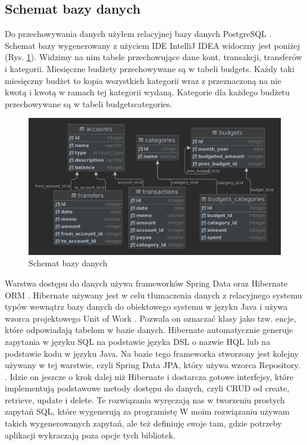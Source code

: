 \documentclass[shortabstract,inz]{iithesis}
\begin{document}
\subsection{Schemat bazy danych}
Do przechowywania danych użyłem relacyjnej bazy danych PostgreSQL \citep{pgsql}. Schemat bazy wygenerowany z użyciem IDE IntelliJ IDEA \citep{idea} widoczny jest poniżej (Rys. \ref{fig:db-diagram}). Widzimy na nim tabele przechowujące dane kont, transakcji, transferów i kategorii. Miesięczne budżety przechowywane są w tabeli budgets. Każdy taki miesięczny budżet to kopia wszystkich kategorii wraz z przeznaczoną na nie kwotą i kwotą w ramach tej kategorii wydaną. Kategorie dla każdego budżetu przechowywane są w tabeli budgets\textunderscore categories.
\begin{figure}
	\centering
	\includegraphics[scale=0.23]{db_diagram.png}
	\caption{Schemat bazy danych}
	\label{fig:db-diagram}
\end{figure}

Warstwa dostępu do danych używa frameworków Spring Data \citep{spring-data} oraz Hibernate ORM \citep{hibernate}. Hibernate używany jest w celu tłumaczenia danych z relacyjnego systemu typów wewnątrz bazy danych do obiektowego systemu w języku Java i używa wzorca projektowego Unit of Work \citep{uow}. Pozwala on oznaczać klasy jako tzw. encje, które odpowiadają tabelom w bazie danych. Hibernate automatycznie generuje zapytania w języku SQL na podstawie języka DSL o nazwie HQL lub na podstawie kodu w języku Java. Na bazie tego frameworka stworzony jest kolejny używany w tej warstwie, czyli Spring Data JPA, który używa wzorca Repository. \citep{repository}. Idzie on jeszcze o krok dalej niż Hibernate i dostarcza gotowe interfejsy, które implementują podstawowe metody dostępu do danych, czyli CRUD od create, retrieve, update i delete. Te rozwiązania wyręczają nas w tworzeniu prostych zapytań SQL, które wygenerują za programistę W moim rozwiązaniu używam takich wygenerowanych zapytań, ale też definiuję swoje tam, gdzie potrzeby aplikacji wykraczają poza opcje tych bibliotek.
\end{document}
